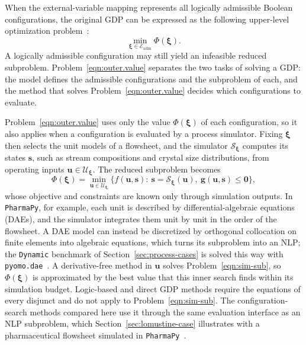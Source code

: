 \documentclass{article}
\begin{document}
When the external-variable mapping represents all logically admissible Boolean configurations, the original GDP can be expressed as the following upper-level optimization problem~\citep{ovalle2025logic}:
\begin{equation}\label{eqn:outer.value}
\min_{\boldsymbol\xi\in\mathcal E_{\mathrm{adm}}}\Phi(\boldsymbol\xi).
\end{equation}
A logically admissible configuration may still yield an infeasible reduced subproblem.
Problem~\eqref{eqn:outer.value} separates the two tasks of solving a GDP: the model defines the admissible configurations and the subproblem of each, and the method that solves Problem~\eqref{eqn:outer.value} decides which configurations to evaluate.

Problem~\eqref{eqn:outer.value} uses only the value \(\Phi(\boldsymbol\xi)\) of each configuration, so it also applies when a configuration is evaluated by a process simulator.
Fixing \(\boldsymbol\xi\) then selects the unit models of a flowsheet, and the simulator \(\mathcal S_{\boldsymbol\xi}\) computes its states \(\mathbf s\), such as stream compositions and crystal size distributions, from operating inputs \(\mathbf u\in\mathcal U_{\boldsymbol\xi}\).
The reduced subproblem becomes
\begin{equation}\label{eqn:sim-sub}
\Phi(\boldsymbol\xi)=\min_{\mathbf u\in\mathcal U_{\boldsymbol\xi}}\bigl\{f(\mathbf u,\mathbf s):\ \mathbf s=\mathcal S_{\boldsymbol\xi}(\mathbf u),\ \mathbf g(\mathbf u,\mathbf s)\leq\mathbf 0\bigr\},\tag{Sim}
\end{equation}
whose objective and constraints are known only through simulation outputs.
In \texttt{PharmaPy}, for example, each unit is described by differential-algebraic equations (DAEs), and the simulator integrates them unit by unit in the order of the flowsheet.
A DAE model can instead be discretized by orthogonal collocation on finite elements into algebraic equations, which turns its subproblem into an NLP; the \texttt{Dynamic} benchmark of Section~\ref{sec:process-cases} is solved this way with \texttt{pyomo.dae}~\citep{nicholson2018pyomo}.
A derivative-free method in \(\mathbf u\) solves Problem~\eqref{eqn:sim-sub}, so \(\Phi(\boldsymbol\xi)\) is approximated by the best value that this inner search finds within its simulation budget.
Logic-based and direct GDP methods require the equations of every disjunct and do not apply to Problem~\eqref{eqn:sim-sub}.
The configuration-search methods compared here use it through the same evaluation interface as an NLP subproblem, which Section~\ref{sec:lomustine-case} illustrates with a pharmaceutical flowsheet simulated in \texttt{PharmaPy}~\citep{casasorozco2021pharmapy}.
\end{document}
